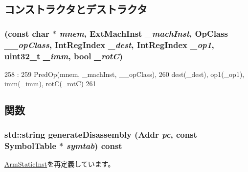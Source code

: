 \subsection{コンストラクタとデストラクタ}
\hypertarget{classArmISA_1_1DataImmOp_a6760ad5c224cb8b80ad74639605925cf}{
\subsubsection[{DataImmOp}]{ (const char $\ast$ {\em mnem}, \/  {\bf ExtMachInst} {\em \_\-machInst}, \/  OpClass {\em \_\-\_\-opClass}, \/  {\bf IntRegIndex} {\em \_\-dest}, \/  {\bf IntRegIndex} {\em \_\-op1}, \/  {\bf uint32\_\-t} {\em \_\-imm}, \/  bool {\em \_\-rotC})}}
\label{classArmISA_1_1DataImmOp_a6760ad5c224cb8b80ad74639605925cf}



\begin{DoxyCode}
258                                                                               :
259         PredOp(mnem, _machInst, __opClass),
260         dest(_dest), op1(_op1), imm(_imm), rotC(_rotC)
261     {}

\end{DoxyCode}


\subsection{関数}
\hypertarget{classArmISA_1_1DataImmOp_a95d323a22a5f07e14d6b4c9385a91896}{
\subsubsection[{generateDisassembly}]{\setlength{\rightskip}{0pt plus 5cm}std::string generateDisassembly ({\bf Addr} {\em pc}, \/  const SymbolTable $\ast$ {\em symtab}) const}}
\label{classArmISA_1_1DataImmOp_a95d323a22a5f07e14d6b4c9385a91896}


\hyperlink{classArmISA_1_1ArmStaticInst_a95d323a22a5f07e14d6b4c9385a91896}{ArmStaticInst}を再定義しています。


